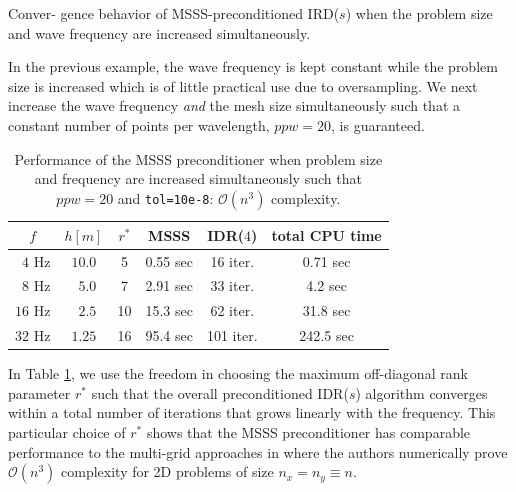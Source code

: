\begin{exper} \label{exp:freq1}
Conver- gence behavior of MSSS-preconditioned IRD($s$) when the problem size and wave frequency are increased simultaneously.
\end{exper}
In the previous example, the wave frequency is kept constant while the problem size is increased which is of little practical use due to oversampling. We next increase the wave frequency \textit{and} the mesh size simultaneously such that a constant number of points per wavelength, $ppw=20$, is guaranteed.
\begin{table}[ht]
\centering
 \caption{Performance of the MSSS preconditioner when problem size and frequency are increased simultaneously such that $ppw = 20$ and \texttt{tol=10e-8}: $\mathcal{O}(n^3)$ complexity.} \label{tab_freq_indep} 
 \begin{tabular}{|c|c|c|c|c|c|}
 \hline
  $f$ & $h [m]$ & $r^\ast$ & MSSS & IDR($4$) & total CPU time\\
  \hline
  $\phantom{0}4$ Hz & $10.0$& \phantom{0}5& 0.55 sec& \phantom{0}16 iter.& \phantom{0}0.71 sec\\
  $\phantom{0}8$ Hz & $\phantom{0}5.0$& \phantom{0}7 & 2.91 sec& \phantom{0}33 iter.& \phantom{00}4.2 sec \\
  $16$ Hz & $\phantom{0}2.5$& 10 &  15.3 sec& \phantom{0}62 iter.& \phantom{0}31.8 sec\\
  $32$ Hz & $1.25$& 16& 95.4 sec&101 iter. & 242.5 sec\\
  \hline
 \end{tabular}
\end{table}
In Table \ref{tab_freq_indep}, we use the freedom in choosing the maximum off-diagonal rank parameter $r^\ast$ such that the overall preconditioned IDR($s$) algorithm converges within a total number of iterations that grows linearly with the frequency.  This particular choice of $r^\ast$ shows that the MSSS preconditioner has comparable performance to the multi-grid approaches in \cite{Plessix2007,Rizzuti2016} where the authors numerically prove $\mathcal{O}(n^3)$ complexity for 2D problems of size $n_x = n_y \equiv n$.

